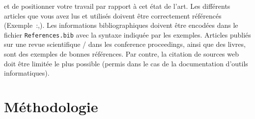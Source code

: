 \documentclass[journal, a4paper]{IEEEtran}
\begin{document}
	et de positionner votre travail par rapport à cet état de l'art.
	Les différents articles que vous avez lus
	et utilisés doivent être correctement référencés
	(Exemple~\cite{small}:,\cite{big}).
	Les informations bibliographiques doivent être encodées dans le fichier
	\texttt{References.bib} avec la syntaxe indiquée par les exemples.
	Articles publiés sur une revue scientifique / dans les conference proceedings,
	ainsi que des livres, sont des exemples de bonnes références.
	Par contre, la citation de sources web doit être limitée le plus possible
	(permis dans le cas de la documentation d'outils informatiques).

	
\section{Méthodologie}\label{sec:met}
%
%

\end{document}
